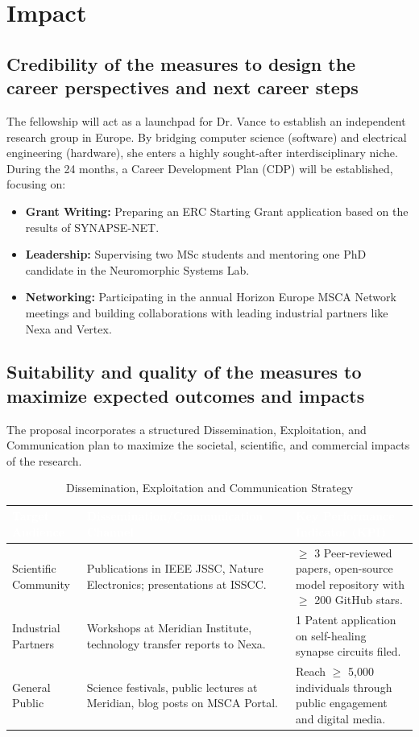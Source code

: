 \section{Impact}
\subsection{Credibility of the measures to design the career perspectives and next career steps}
The fellowship will act as a launchpad for Dr. Vance to establish an independent research group in Europe. By bridging computer science (software) and electrical engineering (hardware), she enters a highly sought-after interdisciplinary niche. During the 24 months, a Career Development Plan (CDP) will be established, focusing on:
\begin{itemize}[leftmargin=*]
  \item \textbf{Grant Writing:} Preparing an ERC Starting Grant application based on the results of SYNAPSE-NET.
  \item \textbf{Leadership:} Supervising two MSc students and mentoring one PhD candidate in the Neuromorphic Systems Lab.
  \item \textbf{Networking:} Participating in the annual Horizon Europe MSCA Network meetings and building collaborations with leading industrial partners like Nexa and Vertex.
\end{itemize}

\subsection{Suitability and quality of the measures to maximize expected outcomes and impacts}
The proposal incorporates a structured Dissemination, Exploitation, and Communication plan to maximize the societal, scientific, and commercial impacts of the research.

\begin{table}[h]
\centering
\caption{Dissemination, Exploitation and Communication Strategy}
\label{tab:dissemination}
\vspace{0.2cm}
\begin{tabularx}{\textwidth}{lXX}
  \toprule
  \rowcolor{MSCABlue} \textcolor{white}{\textbf{Target Audience}} & \textcolor{white}{\textbf{Dissemination/Communication Channel}} & \textcolor{white}{\textbf{Key Performance Indicator (KPI)}} \\ \midrule
  Scientific Community & Publications in IEEE JSSC, Nature Electronics; presentations at ISSCC. & $\ge$ 3 Peer-reviewed papers, open-source model repository with $\ge$ 200 GitHub stars. \\
  Industrial Partners & Workshops at Meridian Institute, technology transfer reports to Nexa. & 1 Patent application on self-healing synapse circuits filed. \\
  General Public & Science festivals, public lectures at Meridian, blog posts on MSCA Portal. & Reach $\ge$ 5,000 individuals through public engagement and digital media. \\ \bottomrule
\end{tabularx}
\end{table}
